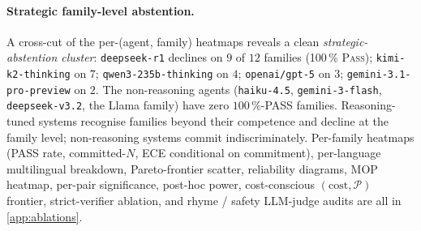 \paragraph{Strategic family-level abstention.}
A cross-cut of the per-(agent, family) heatmaps reveals a clean
\emph{strategic-abstention cluster}:
\texttt{deepseek-r1} declines on $9$ of $12$ families
(100\,\% \textsc{Pass}); \texttt{kimi-k2-thinking} on $7$;
\texttt{qwen3-235b-thinking} on $4$; \texttt{openai/gpt-5} on $3$;
\texttt{gemini-3.1-pro-preview} on $2$. The non-reasoning agents
(\texttt{haiku-4.5}, \texttt{gemini-3-flash}, \texttt{deepseek-v3.2},
the Llama family) have zero $100\,\%$-PASS families. Reasoning-tuned
systems recognise families beyond their competence and decline at the
family level; non-reasoning systems commit indiscriminately. Per-family
heatmaps (PASS rate, committed-$N$, ECE conditional on commitment),
per-language multilingual breakdown, Pareto-frontier scatter,
reliability diagrams, MOP heatmap, per-pair significance, post-hoc
power, cost-conscious $(\text{cost}, \mathcal{P})$ frontier,
strict-verifier ablation, and rhyme / safety LLM-judge audits are all
in \autoref{app:ablations}.

